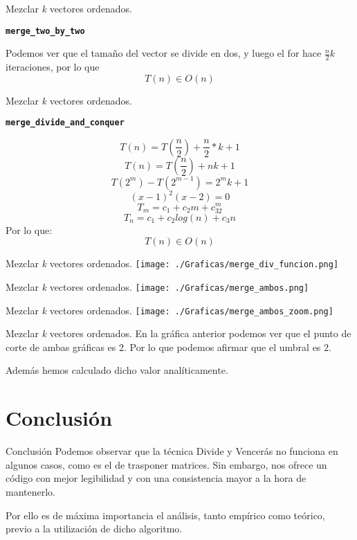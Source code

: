 \documentclass[10pt, xcolor=table]{beamer}
\begin{document}
\begin{frame}[fragile]{Mezclar \textit{k} vectores ordenados. }
\begin{center}
\textbf{\large{\texttt{merge\_two\_by\_two}}}
\end{center}
Podemos ver que el tamaño del vector se divide en dos, y luego el for hace $\frac{n}{2}k$ iteraciones, por lo que 
$$T(n) \in O(n)$$ 
\end{frame}
\begin{frame}[fragile]{Mezclar \textit{k} vectores ordenados. }
\begin{center}
\textbf{\large{\texttt{merge\_divide\_and\_conquer}}}
\end{center}

$$T(n)=T(\frac{n}{2})+\frac{n}{2}*k +1 $$
$$T(n) = T(\frac{n}{2}) + nk +1$$
$$T(2^m) - T(2^{m-1}) = 2^mk+1$$
$$(x-1)^2(x-2) = 0$$
$$T_m = c_1 + c_2m +c_32^m$$
$$T_n = c_1 + c_2log(n) + c_3n$$
Por lo que:
$$T(n) \in O(n)$$
\end{frame}


\begin{frame}[fragile]{Mezclar \textit{k} vectores ordenados. }
\texttt{[image: ./Graficas/merge\_div\_funcion.png]}
\end{frame}

\begin{frame}[fragile]{Mezclar \textit{k} vectores ordenados. }
\texttt{[image: ./Graficas/merge\_ambos.png]}
\end{frame}
\begin{frame}[fragile]{Mezclar \textit{k} vectores ordenados. }
\texttt{[image: ./Graficas/merge\_ambos\_zoom.png]}
\end{frame}
\begin{frame}[fragile]{Mezclar \textit{k} vectores ordenados. }
En la gráfica anterior podemos ver que el punto de corte de ambas gráficas es 2.
\newline
Por lo que podemos afirmar que el umbral es 2.

\newline Además hemos calculado dicho valor analíticamente.
\end{frame}


\section{Conclusión}

\begin{frame}{Conclusión}
Podemos observar que la técnica Divide y Vencerás no funciona en algunos casos, como es el de trasponer matrices. Sin embargo, nos ofrece un código con mejor legibilidad y con una consistencia mayor a la hora de mantenerlo.

Por ello es de máxima importancia el análisis, tanto empírico como teórico, previo a la utilización de dicho algoritmo.

\end{frame}
\end{document}
